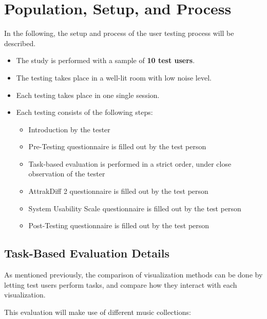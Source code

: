 \section{Population, Setup, and Process}

In the following, the setup and process of the user testing process will be described.

\begin{itemize}
  \item The study is performed with a sample of \textbf{10 test users}. 
  \item The testing takes place in a well-lit room with low noise level.
  \item Each testing takes place in one single session.
  \item Each testing consists of the following steps:
	\begin{itemize}
		\item Introduction by the tester
		\item Pre-Testing questionnaire is filled out by the test person
		\item Task-based evaluation is performed in a strict order, under close observation of the tester
		\item AttrakDiff 2 questionnaire is filled out by the test person	
		\item System Usability Scale questionnaire is filled out by the test person	
		\item Post-Testing questionnaire is filled out by the test person
	\end{itemize}
\end{itemize}

\subsection{Task-Based Evaluation Details}
\label{subsec:task-based-evaluation}

As mentioned previously, the comparison of visualization methods can be done by letting test users perform tasks, and compare how they interact with each visualization. 

This evaluation will make use of different music collections:

